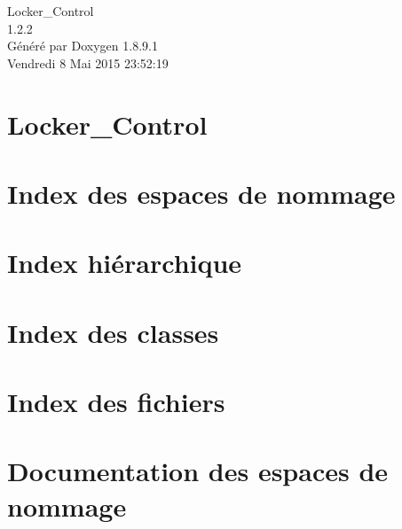 \documentclass[twoside]{book}
\newcommand{\+}{\discretionary{\mbox{\scriptsize$\hookleftarrow$}}{}{}}
\newcommand{\clearemptydoublepage}{%
  \newpage{\pagestyle{empty}\cleardoublepage}%
}
\begin{document}
\hypersetup{pageanchor=false,
             bookmarks=true,
             bookmarksnumbered=true,
             pdfencoding=unicode
            }
\begin{titlepage}
\vspace*{7cm}
\begin{center}%
{\Large Locker\+\_\+\+Control \\[1ex]\large 1.\+2.\+2 }\\
\vspace*{1cm}
{\large Généré par Doxygen 1.8.9.1}\\
\vspace*{0.5cm}
{\small Vendredi 8 Mai 2015 23:52:19}\\
\end{center}
\end{titlepage}
\clearemptydoublepage
\tableofcontents
\clearemptydoublepage
{}
\hypersetup{pageanchor=true}

\chapter{Locker\+\_\+\+Control}
\label{md__s_1__q_t__c_r_e_a_t_o_r__locker__control__r_e_a_d_m_e}
\hypertarget{md__s_1__q_t__c_r_e_a_t_o_r__locker__control__r_e_a_d_m_e}{}

\chapter{Index des espaces de nommage}

\chapter{Index hiérarchique}

\chapter{Index des classes}

\chapter{Index des fichiers}

\chapter{Documentation des espaces de nommage}

\end{document}
